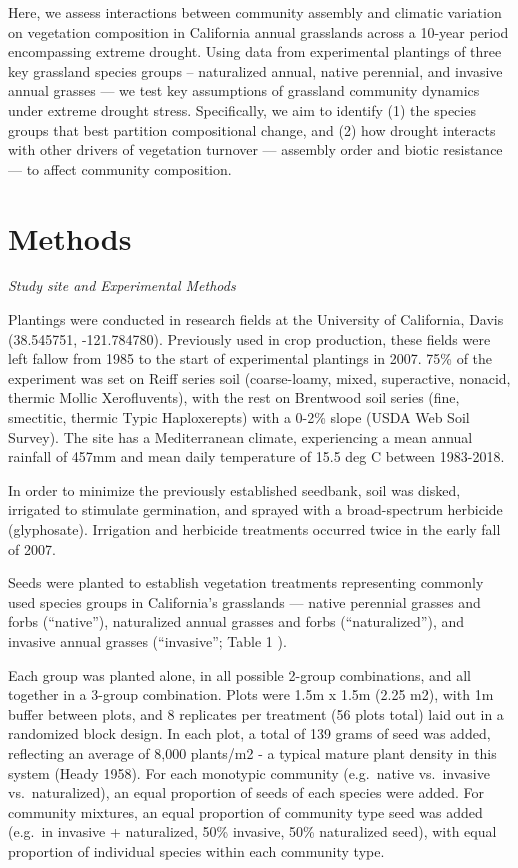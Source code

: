 \documentclass[twoside,12pt,final]{ucthesis-CA2012}
\begin{document}
\begin{ucmainmatter}
Here, we assess interactions between community assembly and climatic variation on vegetation composition in California annual grasslands across a 10-year period encompassing extreme drought.
Using data from experimental plantings of three key grassland species groups -- naturalized annual, native perennial, and invasive annual grasses --- we test key assumptions of grassland community dynamics under extreme drought stress.
Specifically, we aim to identify (1) the species groups that best partition compositional change, and (2) how drought interacts with other drivers of vegetation turnover --- assembly order and biotic resistance --- to affect community composition.

\hypertarget{methods}{%
\section{Methods}\label{methods}}

\emph{Study site and Experimental Methods}

Plantings were conducted in research fields at the University of California, Davis (38.545751, -121.784780).
Previously used in crop production, these fields were left fallow from 1985 to the start of experimental plantings in 2007.
75\% of the experiment was set on Reiff series soil (coarse-loamy, mixed, superactive, nonacid, thermic Mollic Xerofluvents), with the rest on Brentwood soil series (fine, smectitic, thermic Typic Haploxerepts) with a 0-2\% slope (USDA Web Soil Survey).
The site has a Mediterranean climate, experiencing a mean annual rainfall of 457mm and mean daily temperature of 15.5 deg C between 1983-2018.

In order to minimize the previously established seedbank, soil was disked, irrigated to stimulate germination, and sprayed with a broad-spectrum herbicide (glyphosate). Irrigation and herbicide treatments occurred twice in the early fall of 2007.

Seeds were planted to establish vegetation treatments representing commonly used species groups in California's grasslands --- native perennial grasses and forbs (``native''), naturalized annual grasses and forbs (``naturalized''), and invasive annual grasses (``invasive''; Table 1 ).

Each group was planted alone, in all possible 2-group combinations, and all together in a 3-group combination.
Plots were 1.5m x 1.5m (2.25 m2), with 1m buffer between plots, and 8 replicates per treatment (56 plots total) laid out in a randomized block design.
In each plot, a total of 139 grams of seed was added, reflecting an average of 8,000 plants/m2 - a typical mature plant density in this system (Heady 1958).
For each monotypic community (e.g.~native vs.~invasive vs.~naturalized), an equal proportion of seeds of each species were added. For community mixtures, an equal proportion of community type seed was added (e.g.~in invasive + naturalized, 50\% invasive, 50\% naturalized seed), with equal proportion of individual species within each community type.


\end{ucmainmatter}
\end{document}
